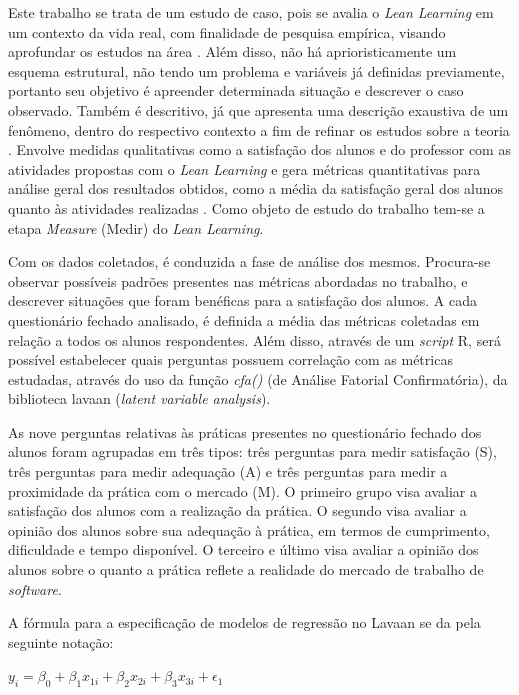 Este trabalho se trata de um estudo de caso, pois se avalia o \textit{Lean Learning} em um contexto da vida real, com finalidade de pesquisa empírica, visando aprofundar os estudos na área \cite{MIGUEL2007}. Além disso, não há aprioristicamente um esquema estrutural, não tendo um problema e variáveis já definidas previamente, portanto seu objetivo é apreender determinada situação e descrever o caso observado\cite{marconi2003fundamentos}\cite{marconi2012tecnicas}. Também é descritivo, já que apresenta uma descrição exaustiva de um fenômeno, dentro do respectivo contexto \cite{Eduser} a fim de refinar os estudos sobre a teoria \cite{MIGUEL2007}. Envolve medidas qualitativas como a satisfação dos alunos e do professor com as atividades propostas com o \textit{Lean Learning} e gera métricas quantitativas para análise geral dos resultados obtidos, como a média da satisfação geral dos alunos quanto às atividades realizadas \cite{Metricas}. Como objeto de estudo do trabalho tem-se a etapa \textit{Measure} (Medir) do \textit{Lean Learning}.

Com os dados coletados, é conduzida a fase de análise dos mesmos. Procura-se observar possíveis padrões presentes nas métricas abordadas no trabalho, e descrever situações que foram benéficas para a satisfação dos alunos. A cada questionário fechado analisado, é definida a média das métricas coletadas em relação a todos os alunos respondentes. Além disso, através de um \textit{script} R, será possível estabelecer quais perguntas possuem correlação com as métricas estudadas, através do uso da função \textit{cfa()} (de Análise Fatorial Confirmatória), da biblioteca lavaan (\textit{latent variable analysis}). 

As nove perguntas relativas às práticas presentes no questionário fechado dos alunos foram agrupadas em três tipos: três perguntas para medir satisfação (S), três perguntas para medir adequação (A) e três perguntas para medir a proximidade da prática com o mercado (M). O primeiro grupo visa avaliar a satisfação dos alunos com a realização da prática. O segundo visa avaliar a opinião dos alunos sobre sua adequação à prática, em termos de cumprimento, dificuldade e tempo disponível. O terceiro e último visa avaliar a opinião dos alunos sobre o quanto a prática reflete a realidade do mercado de trabalho de \textit{software}.

A fórmula para a especificação de modelos de regressão no Lavaan se da pela seguinte notação:

$y_{i} = \beta_{0} + \beta_{1}x_{1i} + \beta_{2}x_{2i} + \beta_{3}x_{3i} + \epsilon_{1}$

